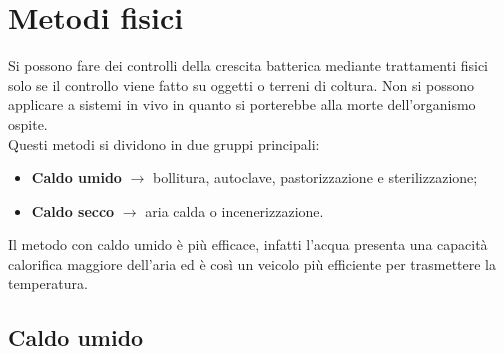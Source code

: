 \section{Metodi fisici}
Si possono fare dei controlli della crescita batterica mediante trattamenti fisici solo se il controllo viene fatto su oggetti o terreni di coltura. Non si possono applicare a sistemi in vivo in quanto si porterebbe alla morte dell'organismo ospite. 
\\Questi metodi si dividono in due gruppi principali:
\begin{itemize}
    \item \textbf{Caldo umido} $\xrightarrow{}$ bollitura, autoclave, pastorizzazione e sterilizzazione; 
    \item \textbf{Caldo secco} $\xrightarrow{}$ aria calda o incenerizzazione.
\end{itemize}
Il metodo con caldo umido è più efficace, infatti l'acqua presenta una capacità calorifica maggiore dell'aria ed è così un veicolo più efficiente per trasmettere la temperatura. 
\subsection{Caldo umido}
